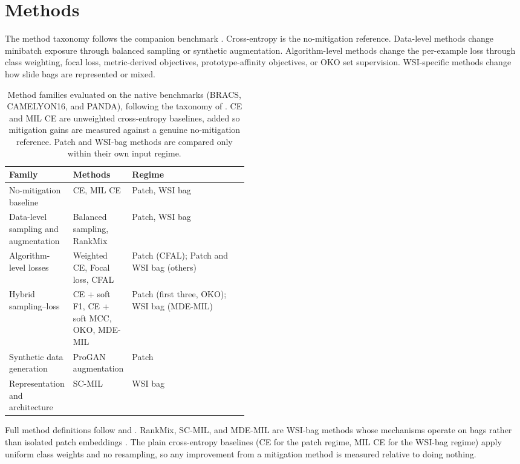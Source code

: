 \documentclass[11pt]{article}
\begin{document}
\section{Methods}
\label{sec:methods}
The method taxonomy follows the companion benchmark \citep{queisler2026imbalanceTCGA}. Cross-entropy is the no-mitigation reference. Data-level methods change minibatch exposure through balanced sampling or synthetic augmentation. Algorithm-level methods change the per-example loss through class weighting, focal loss, metric-derived objectives, prototype-affinity objectives, or OKO set supervision. WSI-specific methods change how slide bags are represented or mixed.

\begin{table}[ht]
  \centering
  \footnotesize
  \begin{tabularx}{\linewidth}{@{}p{0.22\linewidth}p{0.24\linewidth}X@{}}
    \toprule
    Family & Methods & Regime\\
    \midrule
    No-mitigation baseline & CE, MIL CE & Patch, WSI bag\\
    Data-level sampling and augmentation & Balanced sampling, RankMix & Patch, WSI bag\\
    Algorithm-level losses & Weighted CE, Focal loss, CFAL & Patch (CFAL); Patch and WSI bag (others)\\
    Hybrid sampling--loss & CE + soft F1, CE + soft MCC, OKO, MDE-MIL & Patch (first three, OKO); WSI bag (MDE-MIL)\\
    Synthetic data generation & ProGAN augmentation & Patch\\
    Representation and architecture & SC-MIL & WSI bag\\
    \bottomrule
  \end{tabularx}
  \caption{Method families evaluated on the native benchmarks (BRACS, CAMELYON16, and PANDA), following the taxonomy of \citet{queisler2026imbalanceTCGA}. CE and MIL CE are unweighted cross-entropy baselines, added so mitigation gains are measured against a genuine no-mitigation reference. Patch and WSI-bag methods are compared only within their own input regime.}
  \label{tab:method-groups}
\end{table}

Full method definitions follow \citet{queisler2026imbalanceTCGA} and \citet{scholz2024imbalanceAware}. RankMix, SC-MIL, and MDE-MIL are WSI-bag methods whose mechanisms operate on bags rather than isolated patch embeddings \citep{chen2023rankmix,juyal2024scMil,ling2025mdeMil}. The plain cross-entropy baselines (CE for the patch regime, MIL CE for the WSI-bag regime) apply uniform class weights and no resampling, so any improvement from a mitigation method is measured relative to doing nothing.
\end{document}
